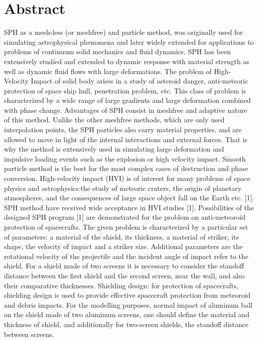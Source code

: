 \documentclass[article,A4,11pt]{llncs}%
\begin{document}
\section*{Abstract}
SPH as a mesh-less (or meshfree) and particle method, was originally used for simulating astrophysical phenomena and later widely extended for applications to problems of continuum solid mechanics and fluid dynamics. SPH has been extensively studied and extended to dynamic response with material strength as well as dynamic fluid flows with large deformations. The problem of High-Velocity Impact of solid body arises in a study of asteroid danger, anti-meteoric protection of space ship hull, penetration problem, etc. This class of problem is characterized by a wide range of large gradients and large deformation combined with phase change.  Advantages of SPH consist in meshfree and adaptive nature of this method. Unlike the other meshfree methods, which are only used interpolation points, the SPH particles also carry material properties, and are allowed to move in light of the internal interactions and external forces. That is why the method is extensively used in simulating large deformation and impulsive loading events such as the explosion or high velocity impact. Smooth particle method is the best for the most complex cases of destruction and phase conversion.
High-velocity impact (HVI) is of interest for many problems of space physics and astrophysics:the study of meteoric craters, the origin of planetary atmospheres, and the consequences of large space object fall on the Earth etc. [1]. SPH method have received wide acceptance in HVI studies [1]. 
Possibilities of the designed SPH program [1] are demonstrated for the problem on anti-meteoroid protection of spacecrafts. The given problem is characterized by a particular set of parameters: a material of the shield, its thickness, a material of striker, its shape, the velocity of impact and a striker size. Additional parameters are the rotational velocity of the projectile and the incident angle of impact refer to the shield. For a shield made of two screens it is necessary to consider the standoff distance between the first shield and the second screen, near the wall, and also their comparative thicknesses. Shielding design: for protection of spacecrafts, shielding design is used to provide effective spacecraft protection from meteoroid and debris impacts. For the modelling purposes, normal impact of aluminum ball on the shield made of two aluminum screens, one should define the material and thickness of shield, and additionally for two-screen shields, the standoff distance between screens.
\end{document}

